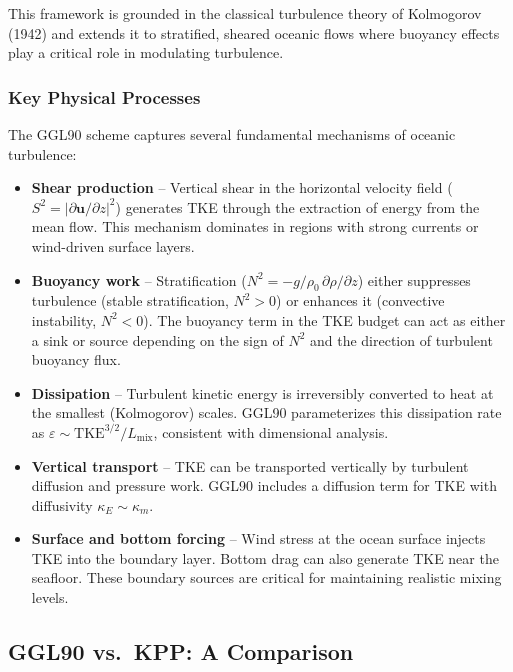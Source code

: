 \documentclass[12pt,letterpaper]{article}
\newcommand{\TKE}{\mathrm{TKE}}
\newcommand{\KM}{\kappa_m}
\newcommand{\KE}{\kappa_E}
\newcommand{\Lmix}{L_{\mathrm{mix}}}
\begin{document}
This framework is grounded in the classical turbulence theory of Kolmogorov
(1942) and extends it to stratified, sheared oceanic flows where buoyancy
effects play a critical role in modulating turbulence.

\subsubsection{Key Physical Processes}

The GGL90 scheme captures several fundamental mechanisms of oceanic turbulence:

\begin{itemize}[leftmargin=*]
  \item \textbf{Shear production} -- Vertical shear in the horizontal velocity
        field ($S^2 = |\partial \mathbf{u}/\partial z|^2$) generates TKE
        through the extraction of energy from the mean flow. This mechanism
        dominates in regions with strong currents or wind-driven surface layers.

  \item \textbf{Buoyancy work} -- Stratification ($N^2 = -g/\rho_0 \,
        \partial \rho / \partial z$) either suppresses turbulence (stable
        stratification, $N^2 > 0$) or enhances it (convective instability,
        $N^2 < 0$). The buoyancy term in the TKE budget can act as either
        a sink or source depending on the sign of $N^2$ and the direction
        of turbulent buoyancy flux.

  \item \textbf{Dissipation} -- Turbulent kinetic energy is irreversibly
        converted to heat at the smallest (Kolmogorov) scales. GGL90
        parameterizes this dissipation rate as $\varepsilon \sim
        \TKE^{3/2} / \Lmix$, consistent with dimensional analysis.

  \item \textbf{Vertical transport} -- TKE can be transported vertically
        by turbulent diffusion and pressure work. GGL90 includes a diffusion
        term for TKE with diffusivity $\KE \sim \KM$.

  \item \textbf{Surface and bottom forcing} -- Wind stress at the ocean
        surface injects TKE into the boundary layer. Bottom drag can also
        generate TKE near the seafloor. These boundary sources are critical
        for maintaining realistic mixing levels.
\end{itemize}

\subsection{GGL90 vs.\ KPP: A Comparison}
\end{document}

